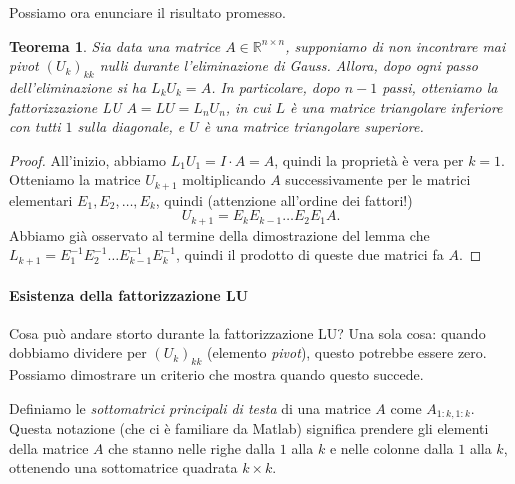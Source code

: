 \documentclass[a4paper]{report}
\newtheorem{theorem}{Teorema}[chapter]
\theoremstyle{definiton}
\theoremstyle{remark}
\begin{document}
Possiamo ora enunciare il risultato promesso.

\begin{theorem}
    Sia data una matrice $A\in\mathbb{R}^{n\times n}$, supponiamo di non incontrare mai pivot $(U_k)_{kk}$ nulli durante l'eliminazione di Gauss. Allora, dopo ogni passo dell'eliminazione si ha $L_k U_k = A$. In particolare, dopo $n-1$ passi, otteniamo la \emph{fattorizzazione LU} $A = LU = L_{n}U_{n}$, in cui $L$ è una matrice triangolare inferiore con tutti $1$ sulla diagonale, e $U$ è una matrice triangolare superiore.
\end{theorem}
\begin{proof}
    All'inizio, abbiamo $L_1 U_1 = I \cdot A = A$, quindi la proprietà è vera per $k=1$. Otteniamo la matrice $U_{k+1}$ moltiplicando $A$ successivamente per le matrici elementari $E_1, E_2,\dots, E_k$, quindi (attenzione all'ordine dei fattori!)
    \[
        U_{k+1} = E_k E_{k-1} \dots E_2 E_1 A.
    \]
    Abbiamo già osservato al termine della dimostrazione del lemma che $L_{k+1} = E_1^{-1} E_2^{-1} \dots E_{k-1}^{-1} E_k^{-1}$, quindi il prodotto di queste due matrici fa $A$.
\end{proof}

\paragraph{Esistenza della fattorizzazione LU}

Cosa può andare storto durante la fattorizzazione LU? Una sola cosa: quando dobbiamo dividere per $(U_k)_{kk}$ (elemento \emph{pivot}), questo potrebbe essere zero. Possiamo dimostrare un criterio che mostra quando questo succede.

Definiamo le \emph{sottomatrici principali di testa} di una matrice $A$ come $A_{1:k,1:k}$. Questa notazione (che ci è familiare da Matlab) significa prendere gli elementi della matrice $A$ che stanno nelle righe dalla $1$ alla $k$ e nelle colonne dalla $1$ alla $k$, ottenendo una sottomatrice quadrata $k\times k$.
\end{document}
